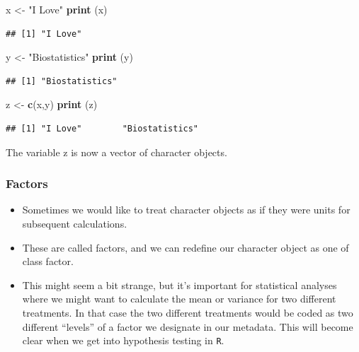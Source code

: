 \documentclass[]{book}
\newenvironment{Shaded}{\begin{snugshade}}{\end{snugshade}}
\newcommand{\KeywordTok}[1]{\textcolor[rgb]{0.13,0.29,0.53}{\textbf{#1}}}
\newcommand{\NormalTok}[1]{#1}
\newcommand{\StringTok}[1]{\textcolor[rgb]{0.31,0.60,0.02}{#1}}
\begin{document}
\begin{Shaded}
\begin{Highlighting}[]
\NormalTok{x <-}\StringTok{ "I Love"}
\KeywordTok{print}\NormalTok{ (x)}
\end{Highlighting}
\end{Shaded}

\begin{verbatim}
## [1] "I Love"
\end{verbatim}

\begin{Shaded}
\begin{Highlighting}[]
\NormalTok{y <-}\StringTok{ "Biostatistics"}
\KeywordTok{print}\NormalTok{ (y)}
\end{Highlighting}
\end{Shaded}

\begin{verbatim}
## [1] "Biostatistics"
\end{verbatim}

\begin{Shaded}
\begin{Highlighting}[]
\NormalTok{z <-}\StringTok{ }\KeywordTok{c}\NormalTok{(x,y)}
\KeywordTok{print}\NormalTok{ (z)}
\end{Highlighting}
\end{Shaded}

\begin{verbatim}
## [1] "I Love"        "Biostatistics"
\end{verbatim}

The variable z is now a vector of character objects.

\hypertarget{factors}{%
\subsubsection{Factors}\label{factors}}

\begin{itemize}
\item
  Sometimes we would like to treat character objects as if they were units for subsequent calculations.
\item
  These are called factors, and we can redefine our character object as one of class factor.
\item
  This might seem a bit strange, but it's important for statistical analyses where we might want to calculate the mean or variance for two different treatments. In that case the two different treatments would be coded as two different ``levels'' of a factor we designate in our metadata. This will become clear when we get into hypothesis testing in \texttt{R}.
\end{itemize}
\end{document}
